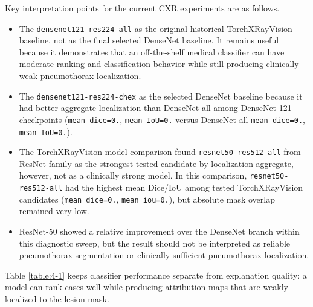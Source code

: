 Key interpretation points for the current CXR experiments are as follows.
\begin{itemize}
\item The 
\texttt{densenet121-\allowbreak res224-\allowbreak all} as the original historical
TorchXRayVision baseline, not as the final selected DenseNet baseline.
It remains useful because it demonstrates that an off-the-shelf medical
classifier can have moderate ranking and classification behavior while still
producing clinically weak pneumothorax localization.
\item The 
\texttt{densenet121-\allowbreak res224-\allowbreak chex} as the selected DenseNet baseline 
because it had better aggregate localization than DenseNet-all
among DenseNet-121 checkpoints (\texttt{mean \allowbreak dice=0.},
\texttt{mean \allowbreak IoU=0.} versus DenseNet-all
\texttt{mean \allowbreak dice=0.}, \texttt{mean \allowbreak IoU=0.}).
\item The 
TorchXRayVision model comparison found \texttt{resnet50-\allowbreak res512-\allowbreak all} from 
ResNet family as the strongest tested candidate by localization aggregate,
however, not as a clinically strong model. In this comparison,
\texttt{resnet50-\allowbreak res512-\allowbreak all} had the highest mean Dice/IoU among tested
TorchXRayVision candidates (\texttt{mean \allowbreak dice=0.},
\texttt{mean \allowbreak iou=0.}), but absolute mask overlap remained very low.
\item ResNet-50 showed a relative improvement over the
DenseNet branch within this diagnostic sweep, but the result should not
be interpreted as reliable pneumothorax segmentation or clinically sufficient
pneumothorax localization.
\end{itemize}

Table \ref{table:4-1} keeps classifier performance separate from explanation
quality: a model can rank cases well while producing attribution maps
that are weakly localized to the lesion mask.

